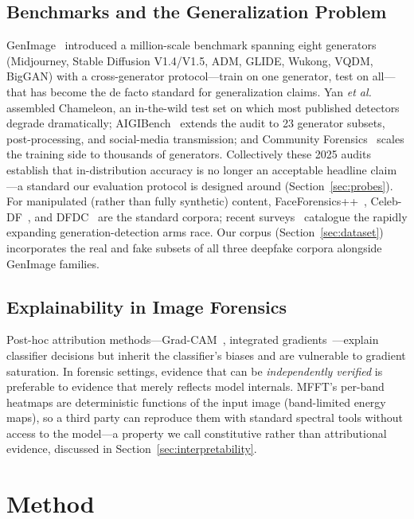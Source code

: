 \documentclass[journal]{IEEEtran}
\begin{document}
\subsection{Benchmarks and the Generalization Problem}
GenImage~\cite{zhu2023genimage} introduced a million-scale benchmark spanning eight generators (Midjourney, Stable Diffusion V1.4/V1.5, ADM, GLIDE, Wukong, VQDM, BigGAN) with a cross-generator protocol---train on one generator, test on all---that has become the de facto standard for generalization claims. Yan \textit{et al.}~\cite{yan2025sanity} assembled Chameleon, an in-the-wild test set on which most published detectors degrade dramatically; AIGIBench~\cite{li2025aigibench} extends the audit to 23 generator subsets, post-processing, and social-media transmission; and Community Forensics~\cite{park2025community} scales the training side to thousands of generators. Collectively these 2025 audits establish that in-distribution accuracy is no longer an acceptable headline claim---a standard our evaluation protocol is designed around (Section~\ref{sec:probes}). For manipulated (rather than fully synthetic) content, FaceForensics++~\cite{rossler2019}, Celeb-DF~\cite{li2020celebdf}, and DFDC~\cite{dolhansky2020} are the standard corpora; recent surveys~\cite{pei2026survey,croitoru2024} catalogue the rapidly expanding generation-detection arms race. Our corpus (Section~\ref{sec:dataset}) incorporates the real and fake subsets of all three deepfake corpora alongside GenImage families.

\subsection{Explainability in Image Forensics}
Post-hoc attribution methods---Grad-CAM~\cite{selvaraju2017}, integrated gradients~\cite{sundararajan2017}---explain classifier decisions but inherit the classifier's biases and are vulnerable to gradient saturation. In forensic settings, evidence that can be \emph{independently verified} is preferable to evidence that merely reflects model internals. MFFT's per-band heatmaps are deterministic functions of the input image (band-limited energy maps), so a third party can reproduce them with standard spectral tools without access to the model---a property we call constitutive rather than attributional evidence, discussed in Section~\ref{sec:interpretability}.

\section{Method}
\label{sec:method}
\end{document}
